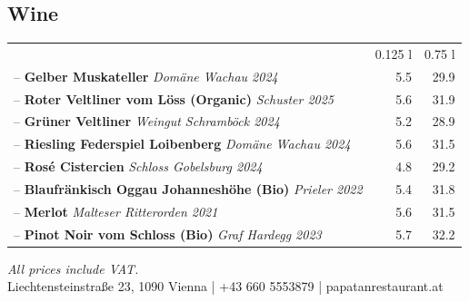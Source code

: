 \documentclass[a4paper,12pt]{article}
\begin{document}
\begin{multicols}{2}
\section*{Wine}
\begin{tabular}{Lrr}
& 0.125 l & 0.75 l\\
-- \textbf{Gelber Muskateller} \emph{Domäne Wachau 2024} & 5.5 & 29.9\\
-- \textbf{Roter Veltliner vom Löss (Organic)} \emph{Schuster 2025} & 5.6 & 31.9\\
-- \textbf{Grüner Veltliner} \emph{Weingut Schramböck 2024} & 5.2 & 28.9\\
-- \textbf{Riesling Federspiel Loibenberg} \emph{Domäne Wachau 2024} & 5.6 & 31.5\\
-- \textbf{Rosé Cistercien} \emph{Schloss Gobelsburg 2024} & 4.8 & 29.2\\
-- \textbf{Blaufränkisch Oggau Johanneshöhe (Bio)} \emph{Prieler 2022} & 5.4 & 31.8\\
-- \textbf{Merlot} \emph{Malteser Ritterorden 2021} & 5.6 & 31.5\\
-- \textbf{Pinot Noir vom Schloss (Bio)} \emph{Graf Hardegg 2023} & 5.7 & 32.2
\end{tabular}

\end{multicols}

\vfill
\begin{center}
    {\small \textit{All prices include VAT.}}\\
    {\small Liechtensteinstraße 23, 1090 Vienna \quad | \quad +43 660 5553879 \quad | \quad papatanrestaurant.at}
\end{center}
\end{document}
